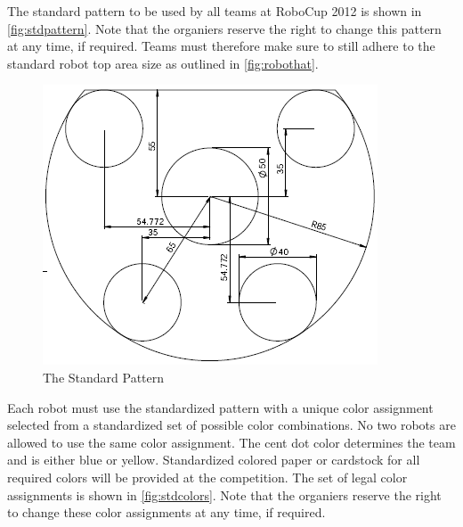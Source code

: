 The standard pattern to be used by all teams at RoboCup 2012 is shown in \autoref{fig:stdpattern}.
Note\removed{,} that the organiers reserve the right to change this pattern at any time, if required.
Teams must therefore make sure to still adhere to the standard robot top area size as outlined in \autoref{fig:robothat}.

\begin{figure}[ht] %
	\centering
	\includegraphics[width=0.8\columnwidth]{img/standard_pattern2010.png}
	\caption{The Standard Pattern}
	\label{fig:stdpattern}
\end{figure}

Each robot must use the standardized pattern with a unique color assignment selected from a standardized set of possible color combinations.
No two robots are allowed to use the same color assignment.
The cent dot color determines the team and is either blue or yellow.
Standardized colored paper or cardstock for all required colors will be provided at the competition.
The set of legal color assignments is shown in \autoref{fig:stdcolors}.
Note\removed{,} that the organiers reserve the right to change these color assignments at any time, if required.

